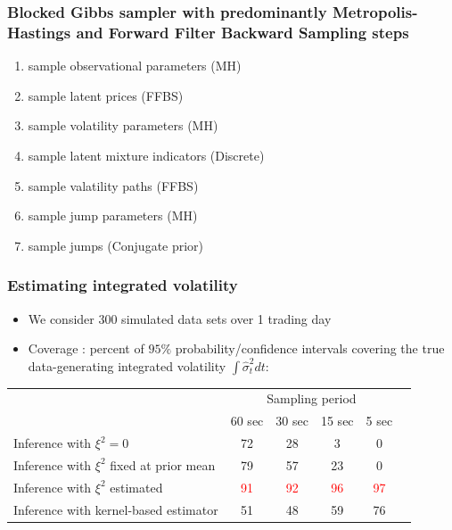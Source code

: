 \documentclass{beamer}
\begin{document}
\begin{frame}
  \frametitle{Blocked Gibbs sampler with predominantly Metropolis-Hastings and Forward Filter Backward Sampling steps}
  \begin{enumerate}
  \item sample observational parameters (MH)
  \item sample latent prices (FFBS)
  \item sample volatility parameters (MH)
  \item sample latent mixture indicators (Discrete)
  \item sample valatility paths (FFBS)
  \item sample jump parameters (MH)
  \item sample jumps (Conjugate prior)
  \end{enumerate}
\end{frame}
\begin{frame}
  \frametitle{Estimating integrated volatility}
  \begin{itemize}
    \item We consider 300 simulated data sets over 1 trading day
  
    \item Coverage : percent of $95\%$ probability/confidence intervals
      covering the true data-generating integrated volatility
      $\int \hat{\sigma}^2_t dt$:
  \end{itemize}
  \begin{table}[h]
    \begin{center}
      \begin{tabular}{l|ccccc}
        \hline
        & \multicolumn{4}{c}{Sampling period} \\
        &   	60 sec 	&   30 sec   &   15 sec & 5 sec  \\ \hline \hline
        Inference with $\xi^2 = 0$   &  72  &   28  &	 3 & 0 \\
        Inference with $\xi^2$ fixed at prior mean &  79 & 57 & 23 & 0 \\
        Inference with $\xi^2$ estimated & \textcolor{red}{91} & \textcolor{red}{92} & \textcolor{red}{96} & \textcolor{red}{97}  \\ \hline
        Inference with kernel-based estimator &  51 & 48 & 59  & 76 \\
        \hline
      \end{tabular}
    \end{center}
  \end{table}
\end{frame}
\end{document}

